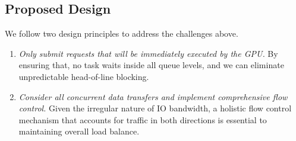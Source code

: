 \begin{comment}
When both directions of all PCIe links are simultaneously used for data transfer, the combined IO bandwidth requirement is larger than what the memory controller can achieve. 
As a result, some directions on some PCIe links cannot achieve their maximum bandwidth.
Because we strive to saturate CPU-side memory bandwidth, this fact means the bandwidth we can achieve through each path is non-uniform.
Further, the amount of bandwidth each link can secure is irregular.
As showcased by Figure~\ref{fig:io-irregular}, it turns out that the bandwidth achieved by each link is strongly related to the activities happening on other links and is hard to predict statically.
Specifically, on our test machine with 4 MI100s, the data traffic in the D2H direction always wins the traffic in the H2D direction when competing for bandwidth.
Thus, the bandwidth achievable by H2D links is usually lower and more susceptible to other data transfer activities.
This issue can cause load imbalance for data transfer as shown in Figure~\ref{fig:io-challenge} (b).
We simplify a profiling trace where we transfer 6.4 GB data from Device to Host, and 9.6 GB data from Host to Device using our baseline solution. 
While all H2D paths are assigned 60 equally-sized packets, they use significantly different amounts of time to finish, leaving the PCIe links underutilized at the end of the transmission process. 
These two pitfalls suggest a more involved solution is necessary to unleash the full potential of PCIe links. 
\end{comment}

\subsection{\textbf{Proposed Design}}
We follow two design principles to address the challenges above.

\begin{enumerate}[leftmargin=*]
    \item \textit{Only submit requests that will be immediately executed by the GPU.}
    By ensuring that, no task waits inside all queue levels, and we can eliminate unpredictable head-of-line blocking. 
    \item \textit{Consider all concurrent data transfers and implement comprehensive flow control.} 
    Given the irregular nature of IO bandwidth, a holistic flow control mechanism that accounts for traffic in both directions is essential to maintaining overall load balance.
\end{enumerate}


